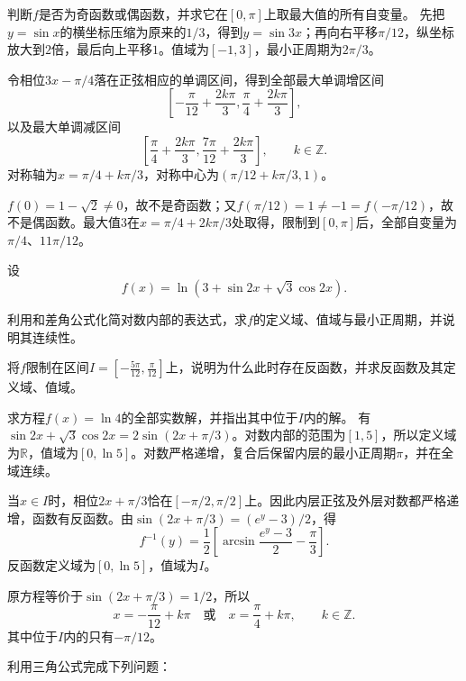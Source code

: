 \quad {}判断\(f\)是否为奇函数或偶函数，并求它在\([0 , \pi]\)上取最大值的所有自变量。
\solutionanswer
{}先把\(y=\sin x\)的横坐标压缩为原来的\(1/3\)，得到\(y=\sin3x\)；再向右平移\(\pi/12\)，纵坐标放大到\(2\)倍，最后向上平移\(1\)。值域为\([-1,3]\)，最小正周期为\(2\pi/3\)。

令相位\(3x-\pi/4\)落在正弦相应的单调区间，得到全部最大单调增区间
\[
\left[-\frac\pi{12}+\frac{2k\pi}3,\frac\pi4+\frac{2k\pi}3\right],
\]
以及最大单调减区间
\[
\left[\frac\pi4+\frac{2k\pi}3,\frac{7\pi}{12}+\frac{2k\pi}3\right],\qquad k\in\mathbb Z.
\]
对称轴为\(x=\pi/4+k\pi/3\)，对称中心为\((\pi/12+k\pi/3,1)\)。

\(f(0)=1-\sqrt2\ne0\)，故不是奇函数；又\(f(\pi/12)=1\ne-1=f(-\pi/12)\)，故不是偶函数。最大值\(3\)在\(x=\pi/4+2k\pi/3\)处取得，限制到\([0,\pi]\)后，全部自变量为\(\pi/4\)、\(11\pi/12\)。


设
\begin{equation*}
    f(x) = \ln \left( 3 + \sin 2 x + \sqrt{3} \cos 2 x \right) .
\end{equation*}

\quad {}利用和差角公式化简对数内部的表达式，求\(f\)的定义域、值域与最小正周期，并说明其连续性。

\quad {}将\(f\)限制在区间\(I = \left[ - \frac{5 \pi}{12} , \frac{\pi}{12} \right]\)上，说明为什么此时存在反函数，并求反函数及其定义域、值域。

\quad {}求方程\(f(x) = \ln 4\)的全部实数解，并指出其中位于\(I\)内的解。
\solutionanswer
{}有\(\sin2x+\sqrt3\cos2x=2\sin(2x+\pi/3)\)。对数内部的范围为\([1,5]\)，所以定义域为\(\mathbb R\)，值域为\([0,\ln5]\)。对数严格递增，复合后保留内层的最小正周期\(\pi\)，并在全域连续。

当\(x\in I\)时，相位\(2x+\pi/3\)恰在\([-\pi/2,\pi/2]\)上。因此内层正弦及外层对数都严格递增，函数有反函数。由\(\sin(2x+\pi/3)=(e^y-3)/2\)，得
\[
f^{-1}(y)=\frac12\left[\arcsin\frac{e^y-3}{2}-\frac\pi3\right].
\]
反函数定义域为\([0,\ln5]\)，值域为\(I\)。

原方程等价于\(\sin(2x+\pi/3)=1/2\)，所以
\[
x=-\frac\pi{12}+k\pi\quad\text{或}\quad x=\frac\pi4+k\pi,\qquad k\in\mathbb Z.
\]
其中位于\(I\)内的只有\(-\pi/12\)。


利用三角公式完成下列问题：

